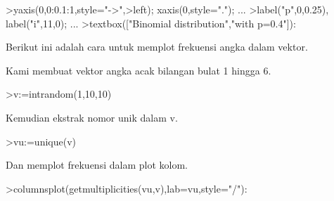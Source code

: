 \documentclass[a4paper,10pt]{article}
\begin{document}
\begin{eulernotebook}
\begin{eulercomment}
\begin{eulercomment}
\begin{eulercomment}
\begin{eulercomment}
\begin{eulercomment}
\begin{eulercomment}
\begin{eulercomment}
\begin{eulercomment}
\begin{eulercomment}
\begin{eulercomment}
\begin{eulercomment}
\begin{eulercomment}
\begin{eulercomment}
\begin{eulercomment}
\begin{eulercomment}
\begin{eulercomment}
\begin{eulercomment}
\begin{eulercomment}
\begin{eulercomment}
\begin{eulercomment}
\begin{eulercomment}
\begin{eulercomment}
\begin{eulercomment}
\begin{eulercomment}
\begin{eulercomment}
\begin{eulercomment}
\begin{eulercomment}
\begin{eulercomment}
\begin{eulercomment}
\begin{eulercomment}
\begin{eulercomment}
\begin{eulercomment}
\begin{eulercomment}
\begin{eulercomment}
\begin{eulercomment}
\begin{eulercomment}
\begin{eulercomment}
\begin{eulercomment}
\begin{eulercomment}
\begin{eulercomment}
\begin{eulercomment}
\begin{eulercomment}
\begin{eulercomment}
\begin{eulercomment}
\begin{eulerprompt}
>yaxis(0,0:0.1:1,style="->",>left); xaxis(0,style="."); ...
>label("p",0,0.25), label("i",11,0); ...
>textbox(["Binomial distribution","with p=0.4"]):
\end{eulerprompt}
\begin{eulercomment}
Berikut ini adalah cara untuk memplot frekuensi angka dalam vektor.

Kami membuat vektor angka acak bilangan bulat 1 hingga 6.
\end{eulercomment}
\begin{eulerprompt}
>v:=intrandom(1,10,10)
\end{eulerprompt}
\begin{euleroutput}
  [8,  5,  8,  8,  6,  8,  8,  3,  5,  5]
\end{euleroutput}
\begin{eulercomment}
Kemudian ekstrak nomor unik dalam v.
\end{eulercomment}
\begin{eulerprompt}
>vu:=unique(v)
\end{eulerprompt}
\begin{euleroutput}
  [3,  5,  6,  8]
\end{euleroutput}
\begin{eulercomment}
Dan memplot frekuensi dalam plot kolom.
\end{eulercomment}
\begin{eulerprompt}
>columnsplot(getmultiplicities(vu,v),lab=vu,style="/"):
\end{eulerprompt}

\end{eulercomment}
\end{eulercomment}
\end{eulercomment}
\end{eulercomment}
\end{eulercomment}
\end{eulercomment}
\end{eulercomment}
\end{eulercomment}
\end{eulercomment}
\end{eulercomment}
\end{eulercomment}
\end{eulercomment}
\end{eulercomment}
\end{eulercomment}
\end{eulercomment}
\end{eulercomment}
\end{eulercomment}
\end{eulercomment}
\end{eulercomment}
\end{eulercomment}
\end{eulercomment}
\end{eulercomment}
\end{eulercomment}
\end{eulercomment}
\end{eulercomment}
\end{eulercomment}
\end{eulercomment}
\end{eulercomment}
\end{eulercomment}
\end{eulercomment}
\end{eulercomment}
\end{eulercomment}
\end{eulercomment}
\end{eulercomment}
\end{eulercomment}
\end{eulercomment}
\end{eulercomment}
\end{eulercomment}
\end{eulercomment}
\end{eulercomment}
\end{eulercomment}
\end{eulercomment}
\end{eulercomment}
\end{eulercomment}
\end{eulernotebook}
\end{document}
